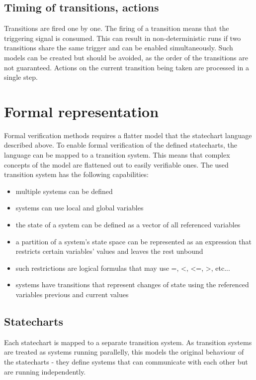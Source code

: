 {  \subsection{Timing of transitions, actions}
Transitions are fired one by one. The firing of a transition means that the triggering signal is consumed. This can result in non-deterministic runs if two transitions share the same trigger and can be enabled simultaneously. Such models can be created but should be avoided, as the order of the transitions are not guaranteed. Actions on the current transition being taken are processed in a single step.
\section{Formal representation}
Formal verification methods requires a flatter model that the statechart language described above. To enable formal verification of the defined statecharts, the language can be mapped to a transition system. This means that complex concepts of the model are flattened out to easily verifiable ones. The used transition system has the following capabilities:
\begin{itemize}
  \item multiple systems can be defined
  \item systems can use local and global variables
  \item the state of a system can be defined as a vector of all referenced variables
  \item a partition of a system's state space can be represented as an expression that restricts certain variables' values and leaves the rest unbound
  \item such restrictions are logical formulas that may use =, <, <=, >, etc...
  \item systems have transitions that represent changes of state using the referenced variables previous and current values
\end{itemize}
  \subsection{Statecharts}
Each statechart is mapped to a separate transition system. As transition systems are treated as systems running parallelly, this models the original behaviour of the statecharts - they define systems that can communicate with each other but are running independently.
}

